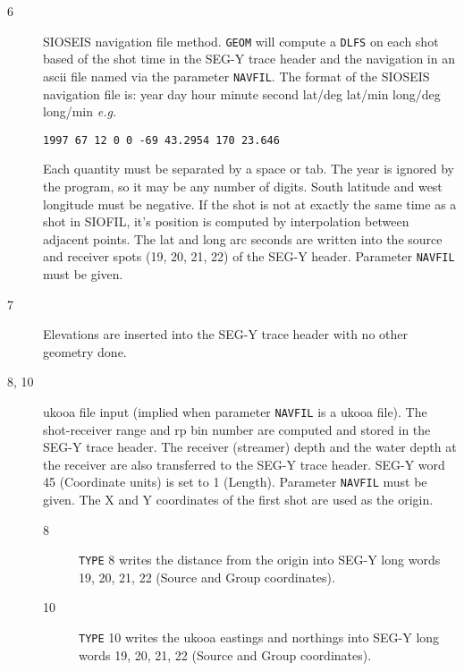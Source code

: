 \begin{description}
\begin{description}
\item[6] SIOSEIS navigation file method.  \texttt{GEOM} will compute a \texttt{DLFS}
         on each \gls{shot} based of the \gls{shot} time in the SEG-Y trace header
         and the navigation in an \gls{ascii} file named via the parameter
         \texttt{NAVFIL}.  The format of the SIOSEIS navigation file is:
         year day hour minute second lat/deg lat/min long/deg long/min \textit{e.g.}     
\begin{verbatim}
1997 67 12 0 0 -69 43.2954 170 23.646
\end{verbatim}
         Each quantity must be separated by a space or tab.  The year
         is ignored by the program, so it may be any number of digits.
         South latitude and west longitude must be negative.  If the
         \gls{shot} is not at exactly the same time as a \gls{shot} in SIOFIL, it's
         position is computed by interpolation between adjacent points.
         The lat and long arc seconds are written into the source and
         receiver spots (19, 20, 21, 22) of the SEG-Y header.
         Parameter \texttt{NAVFIL} must be given.

\item[7] Elevations are inserted into the SEG-Y trace header with no
         other geometry done.

\item[8, 10] \gls{ukooa} file input (implied when parameter \texttt{NAVFIL} is a \gls{ukooa}
         file).  The shot-receiver range and \gls{rp} bin number are computed
         and stored in the SEG-Y trace header.  The receiver (streamer)
         depth and the water depth at the receiver are also transferred
         to the SEG-Y trace header.  SEG-Y word 45 (Coordinate units)
         is set to 1 (Length).  Parameter \texttt{NAVFIL} must be given.  The
         X and Y coordinates of the first \gls{shot} are used as the origin.
\begin{description}
\item[8]\texttt{TYPE} 8 writes the distance from the origin into SEG-Y long
           words 19, 20, 21, 22 (Source and Group coordinates).
\item[10]\texttt{TYPE} 10 writes the \gls{ukooa} eastings and northings into SEG-Y long
           words 19, 20, 21, 22 (Source and Group coordinates).
\end{description}


\end{description}
\end{description}
